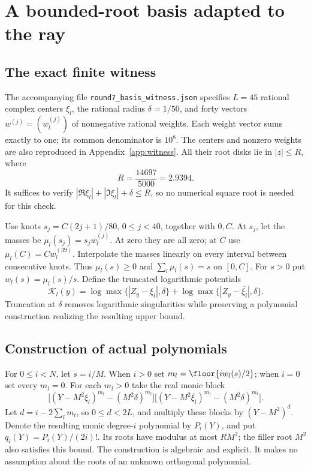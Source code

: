 \section{A bounded-root basis adapted to the ray}\label{sec:basis}
\subsection{The exact finite witness}
The accompanying file \texttt{round7\_basis\_witness.json} specifies
$L=45$ rational complex centers $\xi_l$, the rational radius
$\delta=1/50$, and forty vectors $w^{(j)}=(w_l^{(j)})$ of
nonnegative rational weights.  Each weight vector sums exactly to one;
its common denominator is $10^8$.  The centers and nonzero weights are
also reproduced in Appendix~\ref{app:witness}.  All their root disks lie
in $|z|\le R$, where
\begin{equation}\label{eq:R}
 R=\frac{14697}{5000}=2.9394.
\end{equation}
It suffices to verify
$|\Re\xi_l|+|\Im\xi_l|+\delta\le R$, so no numerical square root
is needed for this check.

Use knots $s_j=C(2j+1)/80$, $0\le j<40$, together with $0,C$.
At $s_j$, let the masses be $\mu_l(s_j)=s_jw_l^{(j)}$.
At zero they are all zero; at $C$ use $\mu_l(C)=Cw_l^{(39)}$.
Interpolate the masses linearly on every interval between consecutive
knots.  Thus $\mu_l(s)\ge0$ and $\sum_l\mu_l(s)=s$ on $[0,C]$.
For $s>0$ put $w_l(s)=\mu_l(s)/s$.
Define the truncated logarithmic potentials
\begin{equation}\label{eq:Kpot}
 \mathcal K_l(y)=\log\max\{|Z_y-\xi_l|,\delta\}
            +\log\max\{|Z_y-\overline{\xi_l}|,\delta\}.
\end{equation}
Truncation at $\delta$ removes logarithmic singularities while preserving
a polynomial construction realizing the resulting upper bound.

\subsection{Construction of actual polynomials}
For $0\le i<N$, let $s=i/M$.  When $i>0$ set
$m_l=\floor{iw_l(s)/2}$; when $i=0$ set every $m_l=0$.
For each $m_l>0$ take the real monic block
\begin{equation}\label{eq:block}
 \bigl[(Y-M^2\xi_l)^{m_l}-(M^2\delta)^{m_l}\bigr]
 \bigl[(Y-M^2\overline{\xi_l})^{m_l}-(M^2\delta)^{m_l}\bigr].
\end{equation}
Let $d=i-2\sum_lm_l$, so $0\le d<2L$, and multiply these blocks
by $(Y-M^2)^d$.  Denote the resulting monic degree-$i$ polynomial
by $P_i(Y)$, and put $q_i(Y)=P_i(Y)/(2i)!$.
Its roots have modulus at most $RM^2$; the filler root $M^2$ also
satisfies this bound.  The construction is algebraic and explicit.
It makes no assumption about the roots of an unknown orthogonal polynomial.

